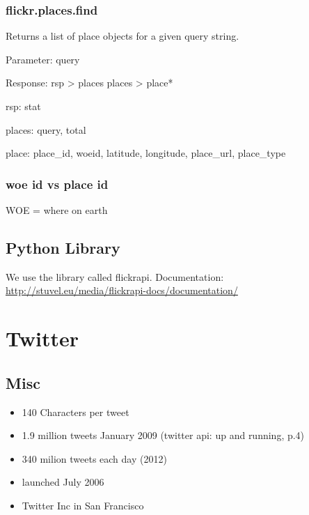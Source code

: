 \documentclass[letterpaper,10pt,english]{sphinxmanual}
\begin{document}
\subsection{flickr.places.find}
\label{flickr:flickr-places-find}
Returns a list of place objects for a given query string.

Parameter: query

Response:
\textbar{} rsp \textgreater{} places
\textbar{} places \textgreater{} place*

\begin{DUlineblock}{0em}
\item[] rsp: stat
\item[] places: query, total
\item[] place: place\_id, woeid, latitude, longitude, place\_url, place\_type
\end{DUlineblock}


\subsection{woe id vs place id}
\label{flickr:woe-id-vs-place-id}
WOE = where on earth


\section{Python Library}
\label{flickr:python-library}
We use the library called flickrapi. Documentation: \href{http://stuvel.eu/media/flickrapi-docs/documentation/}{http://stuvel.eu/media/flickrapi-docs/documentation/}


\chapter{Twitter}
\label{twitter:twitter}\label{twitter::doc}

\section{Misc}
\label{twitter:misc}\begin{itemize}
\item {} 
140 Characters per tweet

\item {} 
1.9 million tweets January 2009 (twitter api: up and running, p.4)

\item {} 
340 milion tweets each day (2012)

\item {} 
launched July 2006

\item {} 
Twitter Inc in San Francisco

\end{itemize}
\end{document}
